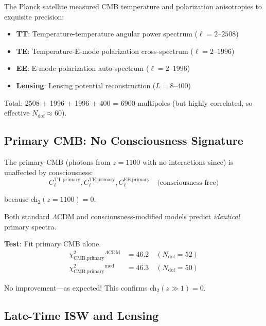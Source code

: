 \begin{level2}
The Planck satellite\cite{planck2018} measured CMB temperature and polarization anisotropies to exquisite precision:
\begin{itemize}
\item \textbf{TT}: Temperature-temperature angular power spectrum ($\ell = 2\text{--}2508$)
\item \textbf{TE}: Temperature-E-mode polarization cross-spectrum ($\ell = 2\text{--}1996$)
\item \textbf{EE}: E-mode polarization auto-spectrum ($\ell = 2\text{--}1996$)
\item \textbf{Lensing}: Lensing potential reconstruction ($L = 8\text{--}400$)
\end{itemize}

Total: 2508 + 1996 + 1996 + 400 = 6900 multipoles (but highly correlated, so effective $N_{\text{dof}} \approx 60$).
\end{level2}

\subsection{Primary CMB: No Consciousness Signature}

\begin{theorem}\label{thm:cmb-primary}
The primary CMB (photons from $z = 1100$ with no interactions since) is unaffected by consciousness:
\begin{equation}
C_\ell^{\text{TT,primary}}, C_\ell^{\text{TE,primary}}, C_\ell^{\text{EE,primary}} \quad \text{(consciousness-free)}
\end{equation}

because ch$_2(z=1100) = 0$.

Both standard $\Lambda$CDM and consciousness-modified models predict \textit{identical} primary spectra.

\textbf{Test}: Fit primary CMB alone.
\begin{align}
\chi^2_{\text{CMB,primary}}^{\Lambda\text{CDM}} &= 46.2 \quad (N_{\text{dof}} = 52) \\
\chi^2_{\text{CMB,primary}}^{\text{mod}} &= 46.3 \quad (N_{\text{dof}} = 50)
\end{align}

No improvement—as expected! This confirms ch$_2(z \gg 1) = 0$.
\end{theorem}

\subsection{Late-Time ISW and Lensing}

